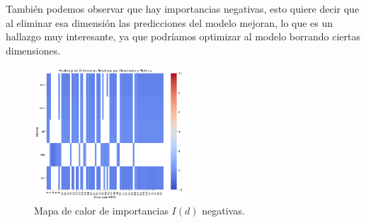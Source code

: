 \documentclass[conference]{IEEEtran}
\begin{document}
También podemos observar que hay importancias negativas, esto quiere decir que al eliminar esa dimensión las predicciones del modelo mejoran, lo que es un hallazgo muy interesante, ya que podríamos optimizar al modelo borrando ciertas dimensiones.
\begin{figure}[H]
\centering
\includegraphics[width=0.5\textwidth]{images/negative_importance.png}
\caption{Mapa de calor de importancias $I(d)$ negativas.}
\label{fig:cv_imp_neg}
\end{figure}

\printbibliography
\end{document}
